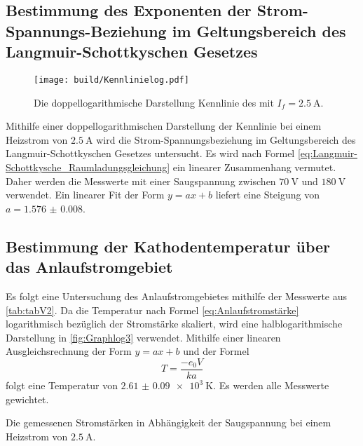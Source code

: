 \subsection{Bestimmung des Exponenten der Strom-Spannungs-Beziehung im Geltungsbereich des Langmuir-Schottkyschen Gesetzes}
\begin{figure}
 \centering
 \caption{Die doppellogarithmische Darstellung Kennlinie des mit $I_f = \SI{2.5}{\ampere}$.}
 \texttt{[image: build/Kennlinielog.pdf]}
 \label{fig:Graphlog2}
\end{figure}
Mithilfe einer doppellogarithmischen Darstellung der Kennlinie bei einem Heizstrom von $\SI{2.5}{\ampere}$
 wird die Strom-Spannungsbeziehung im Geltungsbereich des Langmuir-Schottkyschen Gesetzes untersucht.
 Es wird nach Formel \ref{eq:Langmuir-Schottkysche_Raumladungsgleichung} ein linearer Zusammenhang vermutet.
Daher werden die Messwerte mit einer Saugspannung zwischen $\SI{70}{\volt}$
und $\SI{180}{\volt}$ verwendet. Ein linearer Fit der Form $y = a x+b$ liefert
eine Steigung von $a = \num{1.576(8)}$.























\subsection{Bestimmung der Kathodentemperatur über das Anlaufstromgebiet}
Es folgt eine Untersuchung des Anlaufstromgebietes mithilfe der Messwerte aus \ref{tab:tabV2}.
Da die Temperatur nach Formel \ref{eq:Anlaufstromstärke} logarithmisch bezüglich
der Stromstärke skaliert, wird eine halblogarithmische Darstellung in
\ref{fig:Graphlog3} verwendet. Mithilfe einer linearen Ausgleichsrechnung der Form
$y = a x+b$ und der Formel
\begin{equation}
  T = \frac{-e_0 V}{k a}
  \end{equation}
  folgt eine Temperatur von $\SI{2.61(9)e3}{\kelvin}$. Es 
werden alle Messwerte gewichtet.


 \begin{table}
  \centering
  \caption{Die gemessenen Stromstärken in Abhängigkeit der Saugspannung bei einem Heizstrom von $\SI{2,5}{\ampere}$.}
  
  \label{tab:tabV2}
 \end{table}

